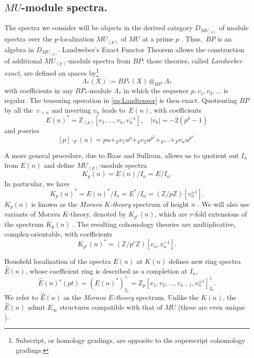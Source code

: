 \documentclass[11pt, reqno]{amsart}
\theoremstyle{plain}
\theoremstyle{definition}
\newcommand{\landw}{\Lambda}
\newcommand{\En}{\widehat{E}(n)}
\DeclareMathOperator*{\gplus}{+}
\DeclareMathOperator*{\gdot}{\cdot}
\begin{document}
\subsection{$MU$-module spectra.}
\label{sec:mumodules}
The spectra  we  consider will be objects in the derived category $D_{MU_{(p)}}$ of module 
spectra over the $p$-localization $MU_{(p)}$ of $MU$ at a prime $p$ \cite[II-III]{EKMM}.  
Thus,~$BP$ is an algebra in $D_{MU_{(p)}}$. Landweber's Exact Functor Theorem 
\cite{Landweber} allows the construction of additional $MU_{(p)}$-module spectra from $BP$: 
those theories, called \emph{Landweber exact}, are defined on spaces by\footnote{Subscript, or homology gradings, are opposite to the superscript cohomology gradings.}
\begin{equation}\label{eq:Landtensor}
\landw_*(X) := BP_*(X)\otimes_{BP^*} \landw_*
\end{equation}
with coefficients in any $BP_*$-module $\landw_*$ in which the sequence $p,v_1,v_2, \dots$ is 
regular. 
The tensoring operation in \eqref{eq:Landtensor} is then exact. Quotienting $BP$ by all 
the~$v_{>n}$ and inverting $v_n$ leads to~$E(n)$,  with coefficients
\[
E(n)^* = \mathbb{Z}_{(p)}[v_1, \dots, v_n, v_n^{-1}], \quad |v_k| = -2(p^k - 1)
\]
and $p$-series
\begin{equation}\label{eq:pseries}
[p]\gdot_F (u) = pu \gplus_F v_1 u^{p} \gplus_F v_2 u^{p^2} \gplus_F \dots \gplus_F v_nu^{p^n}.
\end{equation}

A more general procedure, due to Baas and Sullivan, allows us to quotient out $I_n$ from $E(n)$ 
and define $MU_{(p)}$-module spectra 
\[
K_p(n) = E(n)/I_n = E/I_n.
\]
In particular, we have
\[
K_p(n)^* = E(n)^*/I_n = E^*/I_n = \left(\mathbb{Z}/p \mathbb{Z}\right)[v_n^{\pm 1}].
\]
\noindent
$K_p(n)$ is known as the \emph{Morava $K$-theory} spectrum of height $n$ \cite{johwil}.  
We will also use variants of Morava $K$-theory,  denoted by $K_{p^r}(n)$,  which are $r$-fold  
extensions of the spectrum $K_{p}(n)$ \cite[\S 2]{Strickland}.  The resulting cohomology theories 
are multiplicative,  complex-orientable,   with coefficients 
\[
K_{p^r}(n)^{*} =\left(\mathbb{Z}/p^r \mathbb{Z}\right)[v_n,v_n^{-1}]. 
\]   

Bousfield localization of the spectra $E(n)$ at $K(n)$ defines new ring spectra $\En$, whose coefficient ring 
is described as a completion at $I_n$,
\[
\En{}^*(pt) = (E(n)^*)^\wedge_{I_n} = \mathbb{Z}_p[v_1, v_2, \dots, v_{n-1}, v_n^{\pm 1}]^\wedge_{I_n}.
\]
We refer to $\En$ as the \emph{Morava $E$-theory} spectrum. Unlike the $K(n)$, the  $\En$ admit 
$E_\infty$ structures compatible with that of $MU$ (these are even unique \cite[Theorem 8.3]{BakerRichter}).
\end{document}
